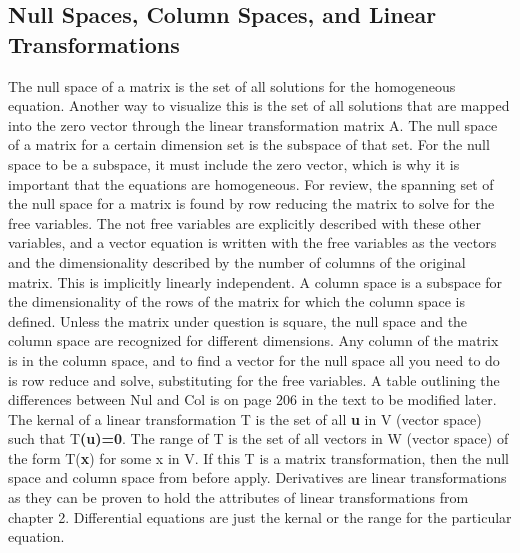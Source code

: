 \documentclass[12pt]{article}
\begin{document}
\subsection{Null Spaces, Column Spaces, and Linear Transformations}
The null space of a matrix is the set of all solutions for the homogeneous equation. Another way to visualize this is the set of all solutions that are mapped into the %
zero vector through the linear transformation  matrix A. The null space of a matrix for a certain dimension set is the subspace of that set. For the null space to be %
a subspace, it must include the zero vector, which is why it is important that the equations are homogeneous. For review, the spanning set of the null space for a matrix %
is found by row reducing the matrix to solve for the free variables. The not free variables are explicitly described with these other variables, and a vector equation is %
written with the free variables as the vectors and the dimensionality described by the number of columns of the original matrix. This is implicitly linearly independent. %
A column space is a subspace for the dimensionality of the rows of the matrix for which the column space is defined. Unless the matrix under question is square, the null %
space and the column space are recognized for different dimensions. Any column of the matrix is in the column space, and to find a vector for the null space all you need to %
do is row reduce and solve, substituting for the free variables. A table outlining the differences between Nul and Col is on page 206 in the text to be modified later. %
\newline
\newline
The kernal of a linear transformation T is the set of all \textbf{u} in V (vector space) such that T\textbf{(u)=0}. The range of T is the set of all vectors in W 
(vector space) of the form T(\textbf{x}) for some x in V. If this T is a matrix transformation, then the null space and column space from before apply. Derivatives are linear
transformations as they can be proven to hold the attributes of linear transformations from chapter 2. Differential equations are just the kernal or the range for the 
particular equation. 
\end{document}
